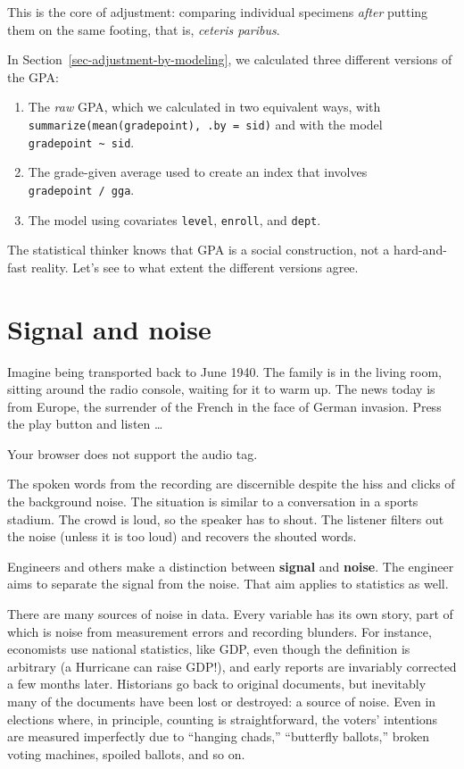 \documentclass[
  letterpaper,
  DIV=11,
  numbers=noendperiod,
  oneside]{scrartcl}
\providecommand{\tightlist}{%
  \setlength{\itemsep}{0pt}\setlength{\parskip}{0pt}}\usepackage{longtable,booktabs,array}
\begin{document}
This is the core of adjustment: comparing individual specimens
\emph{after} putting them on the same footing, that is, \emph{ceteris
paribus}.

In Section~\ref{sec-adjustment-by-modeling}, we calculated three
different versions of the GPA:

\begin{enumerate}
\def\labelenumi{\arabic{enumi}.}
\tightlist
\item
  The \emph{raw} GPA, which we calculated in two equivalent ways, with
  \texttt{summarize(mean(gradepoint),\ .by\ =\ sid)} and with the model
  \texttt{gradepoint\ \textasciitilde{}\ sid}.
\item
  The grade-given average used to create an index that involves
  \texttt{gradepoint\ /\ gga}.
\item
  The model using covariates \texttt{level}, \texttt{enroll}, and
  \texttt{dept}.
\end{enumerate}

The statistical thinker knows that GPA is a social construction, not a
hard-and-fast reality. Let's see to what extent the different versions
agree.

\newpage

\section{Signal and noise}\label{sec-signal-and-noise}

Imagine being transported back to June 1940. The family is in the living
room, sitting around the radio console, waiting for it to warm up. The
news today is from Europe, the surrender of the French in the face of
German invasion. Press the play button and listen \ldots{}

Your browser does not support the audio tag.

The spoken words from the recording are discernible despite the hiss and
clicks of the background noise. The situation is similar to a
conversation in a sports stadium. The crowd is loud, so the speaker has
to shout. The listener filters out the noise (unless it is too loud) and
recovers the shouted words.

Engineers and others make a distinction between \textbf{signal} and
\textbf{noise}. The engineer aims to separate the signal from the noise.
That aim applies to statistics as well.

There are many sources of noise in data. Every variable has its own
story, part of which is noise from measurement errors and recording
blunders. For instance, economists use national statistics, like GDP,
even though the definition is arbitrary (a Hurricane can raise GDP!),
and early reports are invariably corrected a few months later.
Historians go back to original documents, but inevitably many of the
documents have been lost or destroyed: a source of noise. Even in
elections where, in principle, counting is straightforward, the voters'
intentions are measured imperfectly due to ``hanging chads,''
``butterfly ballots,'' broken voting machines, spoiled ballots, and so
on.
\end{document}
